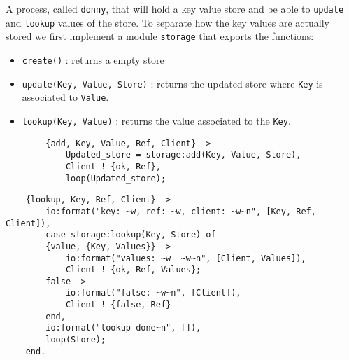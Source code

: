 \documentclass[a4paper,11pt]{article}
\begin{document}
A process, called {\tt donny}, that will
hold a key value store and be able to {\tt update} and {\tt lookup}
values of the store. To separate how the key values are actually
stored we first implement a module {\tt storage} that exports the functions:

\begin{itemize}
\item {\tt create()} : returns a empty store
\item {\tt update(Key, Value, Store)} : returns the updated store where {\tt Key} is associated to {\tt Value}.
\item {\tt lookup(Key, Value)} : returns the value associated to the {\tt Key}.
\end{itemize}


\begin{verbatim}
        {add, Key, Value, Ref, Client} ->
            Updated_store = storage:add(Key, Value, Store),
            Client ! {ok, Ref},
            loop(Updated_store);
\end{verbatim}

\begin{verbatim}
	{lookup, Key, Ref, Client} ->
	    io:format("key: ~w, ref: ~w, client: ~w~n", [Key, Ref, Client]),
	    case storage:lookup(Key, Store) of
		{value, {Key, Values}} ->
		    io:format("values: ~w  ~w~n", [Client, Values]),
		    Client ! {ok, Ref, Values};
		false ->
		    io:format("false: ~w~n", [Client]),
		    Client ! {false, Ref}
	    end,
	    io:format("lookup done~n", []),
	    loop(Store);
    end.
\end{verbatim}
\end{document}
